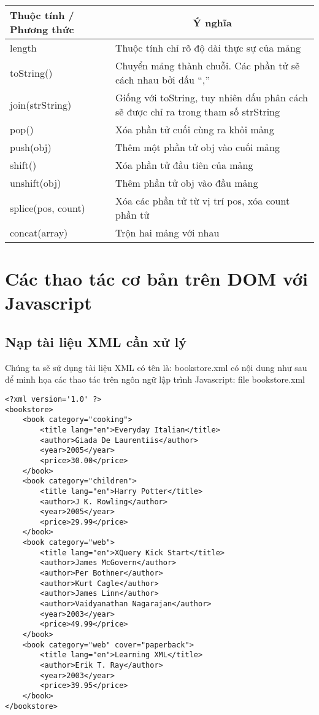 \begin{enumerate}
\begin{center}
\begin{longtable}{|m{3cm}|m{7cm}|}
\hline
\textbf{Thuộc tính / Phương thức} & \multicolumn{1}{c|}{\textbf{Ý nghĩa}}\\ \hline
length &	Thuộc tính chỉ rõ độ dài thực sự của mảng \\ \hline
toString()&	Chuyển mảng thành chuỗi. Các phần tử sẽ cách nhau bởi dấu “,”\\ \hline
join(strString) &	Giống với toString, tuy nhiên dấu phân cách sẽ được chỉ ra trong tham số strString\\ \hline
pop()&	Xóa phần tử cuối cùng ra khỏi mảng\\ \hline
push(obj) &	Thêm một phần tử obj vào cuối mảng\\ \hline
shift()&	Xóa phần tử đầu tiên của mảng\\ \hline
unshift(obj)&	Thêm phần tử obj vào đầu mảng\\ \hline
splice(pos, count) &	Xóa các phần tử từ vị trí pos, xóa count phần tử\\ \hline
concat(array) &	Trộn hai mảng với nhau\\ \hline

\end{longtable}

\end{center}
\vspace{-1cm}
\end{enumerate}
\section{Các thao tác cơ bản trên DOM với Javascript}
\subsection{Nạp tài liệu XML cần xử lý}
Chúng ta sẽ sử dụng tài liệu XML có tên là: bookstore.xml có nội dung như sau để minh họa các thao tác trên ngôn ngữ lập trình Javascript:
file bookstore.xml
\lstset{language=XML}
\begin{lstlisting}[escapechar=`]
<?xml version='1.0' ?>
<bookstore> 
	<book category="cooking"> 
		<title lang="en">Everyday Italian</title> 
		<author>Giada De Laurentiis</author> 
		<year>2005</year> 
		<price>30.00</price>
	</book> 
	<book category="children"> 
		<title lang="en">Harry Potter</title> 
		<author>J K. Rowling</author> 
		<year>2005</year> 
		<price>29.99</price> 
	</book> 
	<book category="web"> 
		<title lang="en">XQuery Kick Start</title> 
		<author>James McGovern</author> 
		<author>Per Bothner</author> 
		<author>Kurt Cagle</author> 
		<author>James Linn</author> 
		<author>Vaidyanathan Nagarajan</author> 
		<year>2003</year> 
		<price>49.99</price> 
	</book> 
	<book category="web" cover="paperback"> 
		<title lang="en">Learning XML</title> 
		<author>Erik T. Ray</author> 
		<year>2003</year> 
		<price>39.95</price> 
	</book> 
</bookstore>
\end{lstlisting}

